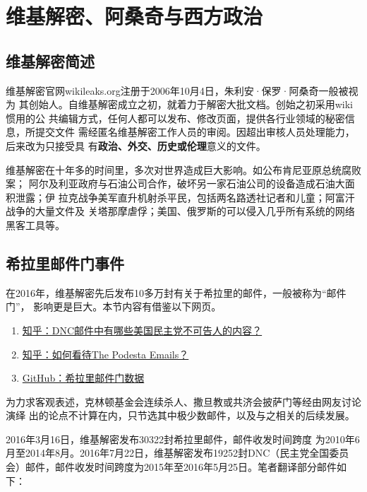 \chapter{维基解密、阿桑奇与西方政治}

\section{维基解密简述}

维基解密官网wikileaks.org注册于2006年10月4日，朱利安·保罗·阿桑奇一般被视为
其创始人。自维基解密成立之初，就着力于解密大批文档。创始之初采用wiki惯用的公
共编辑方式，任何人都可以发布、修改页面，提供各行业领域的秘密信息，所提交文件
需经匿名维基解密工作人员的审阅。因超出审核人员处理能力，后来改为只接受具
有\textbf{政治、外交、历史或伦理}意义的文件。

维基解密在十年多的时间里，多次对世界造成巨大影响。如公布肯尼亚原总统腐败案；
阿尔及利亚政府与石油公司合作，破坏另一家石油公司的设备造成石油大面积泄露；伊
拉克战争美军直升机射杀平民，包括两名路透社记者和儿童；阿富汗战争的大量文件及
关塔那摩虐俘；美国、俄罗斯的可以侵入几乎所有系统的网络黑客工具等。

\section{希拉里邮件门事件}
\label{sec:podestamail}

在2016年，维基解密先后发布10多万封有关于希拉里的邮件，一般被称为“邮件门”，
影响更是巨大。本节内容有借鉴以下网页。
\begin{enumerate}
\item \href{https://www.zhihu.com/question/41676600}{知乎：DNC邮件中有哪些美国民主党不可告人的内容？}

\item \href{https://www.zhihu.com/question/51362588}{知乎：如何看待The Podesta Emails？}

\item \href{https://github.com/zhouningyi/us_selection_crack}{GitHub：希拉里邮件门数据}
\end{enumerate}


为力求客观表述，克林顿基金会连续杀人、撒旦教或共济会披萨门等经由网友讨论演绎
出的论点不计算在内，只节选其中极少数邮件，以及与之相关的后续发展。

2016年3月16日，维基解密发布30322封希拉里邮件，邮件收发时间跨度
为2010年6月至2014年8月。2016年7月22日，维基解密发布19252封DNC（民主党全国委员
会）邮件，邮件收发时间跨度为2015年至2016年5月25日。笔者翻译部分邮件如下：

